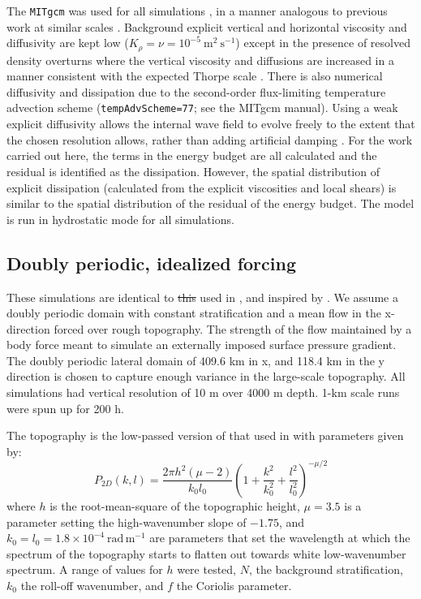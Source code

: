 \documentclass[twocol]{ametsocV5}
\providecommand{\DIFadd}[1]{{\protect\color{blue}\uwave{#1}}} %
\providecommand{\DIFdel}[1]{{\protect\color{red}\sout{#1}}}                      %
\providecommand{\DIFaddbegin}{} %
\providecommand{\DIFaddend}{} %
\providecommand{\DIFdelbegin}{} %
\providecommand{\DIFdelend}{} %
\begin{document}
The \verb+MITgcm+ was used for all simulations \citep{marshalletal97}, in a manner analogous to previous work at similar scales \citep{buijsmanetal14,klymaketal16b, klymak18}.  Background explicit vertical and horizontal viscosity and diffusivity are kept low ($K_{\rho} = \nu = 10^{-5}\ \mathrm{m^2\ s^{-1}}$) except in the presence of resolved density overturns where the vertical viscosity and diffusions are increased in a manner consistent with the expected Thorpe scale \citep{klymaklegg10}.  There is also numerical diffusivity and dissipation due to the second-order flux-limiting temperature advection scheme (\verb+tempAdvScheme=77+; see the MITgcm manual).  Using a weak explicit diffusivity allows the internal wave field to evolve freely to the extent that the chosen resolution allows, rather than adding artificial damping \citep{ShakespeareHogg17}.  For the work carried out here, the terms in the energy budget are all calculated and the residual is identified as the dissipation.  However, the spatial distribution of explicit dissipation (calculated from the explicit viscosities and local shears) is similar to the spatial distribution of the residual of the energy budget.  The model is run in hydrostatic mode for all simulations.  

\subsection{Doubly periodic, idealized forcing}

These simulations are identical to \DIFdelbegin \DIFdel{this }\DIFdelend \DIFaddbegin \DIFadd{the ones }\DIFaddend used in \citet{klymak18}, and inspired by \citet{nikurashinferrari14}.  We assume a doubly periodic domain with constant stratification and a mean flow in the x-direction forced over rough topography.  The strength of the flow maintained by a body force meant to simulate an externally imposed surface pressure gradient.  The doubly periodic lateral domain of 409.6 km in x, and 118.4 km in the y direction is chosen to capture enough variance in the large-scale topography. All simulations had \DIFaddbegin \DIFadd{a constant }\DIFaddend vertical resolution of 10 m over 4000 m depth.  1-km scale runs were spun up for 200 h.

The topography is the low-passed version of that used in \cite{klymak18} with parameters given by: 
\begin{equation}
    P_{2D}(k,l) = \frac{2\pi h^2 \left(\mu-2 \right)}{k_0l_0}\left( 1 + \frac{k^2}{k_0^2} + \frac{l^2}{l_0^2}\right)^{-\mu/2}
    \label{eq:topo2d}
\end{equation}
where $h$ is the root-mean-square of the topographic height, $\mu=3.5$ is a parameter setting the high-wavenumber slope of $-1.75$, and $k_0=l_0 = 1.8\times10^{-4}\ \mathrm{rad\,m^{-1}}$ are parameters that set the wavelength at which the spectrum of the topography starts to flatten out towards white low-wavenumber spectrum.  A range of values for $h$ were tested, $N$, the background stratification, $k_0$ the roll-off wavenumber, and $f$ the Coriolis parameter.  
\end{document}
